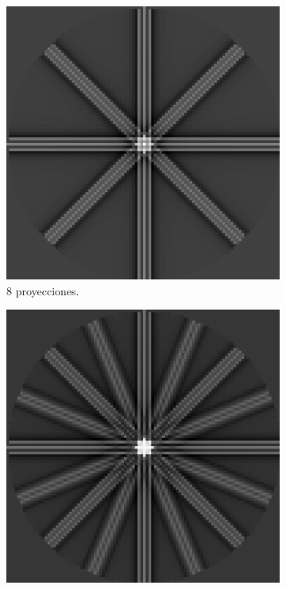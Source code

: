 \documentclass[letterpaper,12pt]{article}
\theoremstyle{plain}
\begin{document}
\begin{figure}[H]
\begin{subfigure}[h]{0.24\textwidth}
       \end{subfigure}
        \begin{subfigure}[h]{0.24\textwidth}
           \centering
           \includegraphics[width=\textwidth]{Figuras/retroproyeccion_p=8_filter=ramp.png}
           \caption{8 proyecciones.} 
        \end{subfigure}
        \begin{subfigure}[h]{0.24\textwidth}
           \centering
           \includegraphics[width=\textwidth]{Figuras/retroproyeccion_p=16_filter=ramp.png}

\end{subfigure}
\end{figure}
\end{document}
